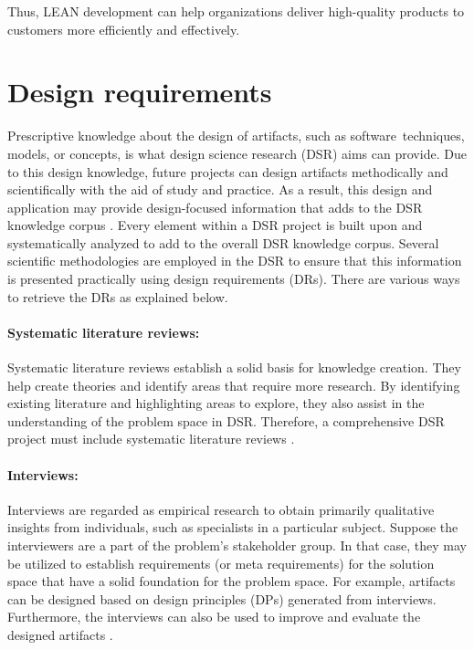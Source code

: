 Thus, LEAN development can help organizations deliver high-quality products to customers more efficiently and effectively.
\clearpage

\section{Design requirements}
\label{background:section:designReqs}
Prescriptive knowledge about the design of artifacts, such as software techniques, models, or concepts, is what design science research (DSR) aims can provide. 
Due to this design knowledge, future projects can design artifacts methodically and scientifically with the aid of study and practice. 
As a result, this design and application may provide design-focused information that adds to the DSR knowledge corpus \cite{misc:dsr:henver}.
Every element within a DSR project is built upon and systematically analyzed to add to the overall DSR knowledge corpus.
Several scientific methodologies are employed in the DSR to ensure that this information is presented practically using design requirements (DRs).
There are various ways to retrieve the DRs as explained below.

\paragraph*{Systematic literature reviews:} 
Systematic literature reviews establish a solid basis for knowledge creation. 
They help create theories and identify areas that require more research.
By identifying existing literature and highlighting areas to explore, they also assist in the understanding of the problem space in DSR.
Therefore, a comprehensive DSR project must include systematic literature reviews \cite{misc:dsr:webster}.

\paragraph*{Interviews:}
Interviews are regarded as empirical research to obtain primarily qualitative insights from individuals, such as specialists in a particular subject. 
Suppose the interviewers are a part of the problem's stakeholder group.
In that case, they may be utilized to establish requirements (or meta requirements) for the solution space that have a solid foundation for the problem space.
For example, artifacts can be designed based on design principles (DPs) generated from interviews.
Furthermore, the interviews can also be used to improve and evaluate the designed artifacts \cite{misc:dsr:mayring}. 

